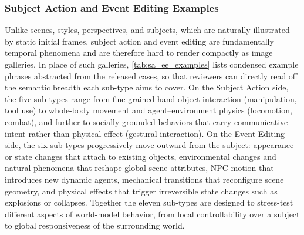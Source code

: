 \subsubsection{Subject Action and Event Editing Examples}
\label{app:sa_ee_examples}

Unlike scenes, styles, perspectives, and subjects, which are naturally illustrated by static initial frames, subject action and event editing are fundamentally temporal phenomena and are therefore hard to render compactly as image galleries. In place of such galleries, \cref{tab:sa_ee_examples} lists condensed example phrases abstracted from the released \benchmark cases, so that reviewers can directly read off the semantic breadth each sub-type aims to cover. On the Subject Action side, the five sub-types range from fine-grained hand-object interaction (manipulation, tool use) to whole-body movement and agent--environment physics (locomotion, combat), and further to socially grounded behaviors that carry communicative intent rather than physical effect (gestural interaction). On the Event Editing side, the six sub-types progressively move outward from the subject: appearance or state changes that attach to existing objects, environmental changes and natural phenomena that reshape global scene attributes, NPC motion that introduces new dynamic agents, mechanical transitions that reconfigure scene geometry, and physical effects that trigger irreversible state changes such as explosions or collapses. Together the eleven sub-types are designed to stress-test different aspects of world-model behavior, from local controllability over a subject to global responsiveness of the surrounding world.

